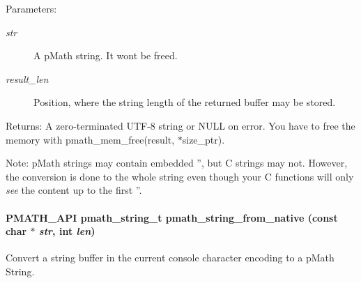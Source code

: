 \begin{Desc}
\item[Parameters:]
\begin{description}
\item[{\em str}]A pMath string. It wont be freed. \item[{\em result\_\-len}]Position, where the string length of the returned buffer may be stored. \end{description}
\end{Desc}
\begin{Desc}
\item[Returns:]A zero-terminated UTF-8 string or NULL on error. You have to free the memory with pmath\_\-mem\_\-free(result, $\ast$size\_\-ptr).\end{Desc}
\begin{Desc}
\item[Note:]pMath strings may contain embedded '', but C strings may not. However, the conversion is done to the whole string even though your C functions will only {\em see\/} the content up to the first ''. \end{Desc}
\hypertarget{group__strings_g37cf187968e366edd0998dda0bd5ea7a}{
\paragraph[{pmath\_\-string\_\-from\_\-native}]{\setlength{\rightskip}{0pt plus 5cm}PMATH\_\-API {\bf pmath\_\-string\_\-t} pmath\_\-string\_\-from\_\-native (const char $\ast$ {\em str}, \/  int {\em len})}\hfill}
\label{group__strings_g37cf187968e366edd0998dda0bd5ea7a}


Convert a string buffer in the current console character encoding to a pMath String. 

